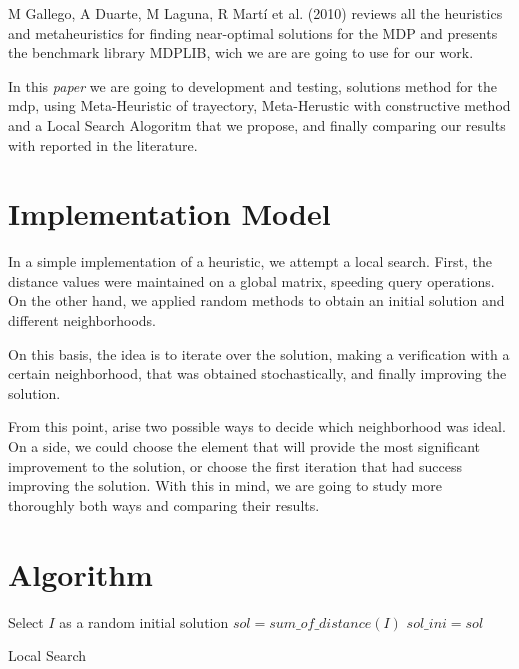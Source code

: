 \documentclass{ci5652}
\begin{document}
M Gallego, A Duarte, M Laguna, R Martí et al.  (2010) reviews all the heuristics and metaheuristics for finding near-optimal solutions for the MDP and presents the benchmark library MDPLIB, wich we are are going to use for our work.

In this \textit{paper}  we are going to development and testing, solutions method for the mdp, using Meta-Heuristic of trayectory, Meta-Herustic with constructive method and a Local Search Alogoritm that we propose, and finally comparing our results with reported in the literature.


\section{Implementation Model}

In a simple implementation of a heuristic, we attempt a local search.
First, the distance values were maintained on a global matrix, speeding
query operations. On the other hand, we applied random methods to obtain an
initial solution and different neighborhoods.

On this basis, the idea is to
iterate over the solution, making a verification with a certain neighborhood,
that was obtained stochastically, and finally improving the solution.

From
this point, arise two possible ways to decide which neighborhood was ideal.
On a side, we could choose the element that will provide the most
significant improvement to the solution, or choose the first iteration that
had success improving the solution. With this in mind, we are going to study
more thoroughly both ways and comparing their results.

\newpage

\section{Algorithm}

\begin{algorithm}
 \DontPrintSemicolon
 \vspace*{0.1cm}
 Select {$I$} as a random initial solution\;
 {$ sol = sum\_of\_distance(I) $}\;
 {$ sol\_ini = sol $}\;
 \vspace*{0.1cm}
 \caption{Local Search}
\end{algorithm}
\end{document}
